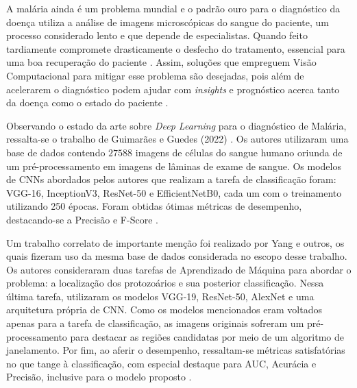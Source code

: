 
A malária ainda é um problema mundial e o padrão ouro para o diagnóstico da  doença utiliza a análise de imagens microscópicas do sangue do paciente, um processo considerado lento e que depende de especialistas. Quando feito tardiamente compromete drasticamente o desfecho do tratamento, essencial para uma boa recuperação do paciente \cite{Dalrymple:2015}. Assim, soluções que empreguem Visão Computacional para mitigar esse problema são desejadas, pois além de acelerarem o diagnóstico podem ajudar com \emph{insights} e prognóstico acerca tanto da doença como o estado do paciente \cite{Ewerton:2019}.

Observando o estado da arte sobre \emph{Deep Learning} para o diagnóstico de Malária, ressalta-se o trabalho de Guimarães e Guedes (2022) \nocite{Felipe:2022}. Os autores utilizaram uma base de dados contendo $\num{27588}$ imagens de células do sangue humano oriunda de um pré-processamento em imagens de lâminas de exame de sangue. Os modelos de CNNs abordados pelos autores que realizam a tarefa de classificação foram: VGG-16, InceptionV3, ResNet-50 e EfficientNetB0,  cada um com o treinamento utilizando 250 épocas. Foram obtidas ótimas métricas de desempenho, destacando-se a Precisão e F-Score \cite{Felipe:2022}.

Um trabalho correlato de importante menção foi realizado por Yang e outros, os quais fizeram uso da mesma base de dados considerada no escopo desse trabalho. Os autores consideraram duas tarefas de Aprendizado de Máquina para abordar o problema:  a localização dos protozoários e sua posterior classificação. Nessa última tarefa, utilizaram os modelos VGG-19, ResNet-50, AlexNet e uma arquitetura própria de CNN. Como os modelos mencionados eram voltados apenas para  a tarefa de classificação, as imagens originais sofreram um pré-processamento para destacar as regiões candidatas por meio de um algoritmo de janelamento. Por fim, ao aferir o desempenho, ressaltam-se métricas satisfatórias no que tange à classificação, com especial destaque para AUC, Acurácia e Precisão, inclusive para o modelo  proposto \cite{Yang:2020}.

